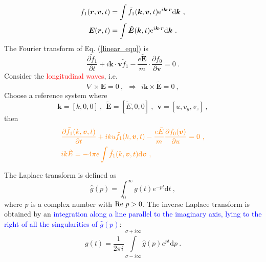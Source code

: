 \documentclass[12pt,a4paper]{article}
\renewcommand{\vec}[1]{\boldsymbol{#1}}
\newcommand{\dif}{\mathrm{d}}
\begin{document}
\begin{align*}
f_1(\vec{r}, \vec{v}, t) &= \int \tilde{f}_1(\vec{k}, \vec{v}, t) {\rm e}^{i\vec{k} \cdot \vec{r} } \dif \vec{k} ~, \\
\vec{E}(\vec{r}, t) &= \int \tilde{\vec{E} }(\vec{k}, t) {\rm e}^{i\vec{k} \cdot \vec{r} } \dif \vec{k} ~.
\end{align*}
The Fourier transform of Eq. (\ref{linear_equ}) is
\begin{equation}
\frac{\partial \tilde{f}_1}{\partial t} +i\vec{k}\cdot \vec{v} \tilde{f}_1 -\frac{e \tilde{\vec{E}} }{m}\cdot \frac{\partial f_0}{\partial \vec{v}} = 0 ~.
\end{equation}
Consider the \textcolor{red}{longitudinal waves}, i.e.
\begin{equation}
\nabla \times \vec{E} = 0 ~, ~~\Longrightarrow ~~ i\vec{k} \times \tilde{\vec{E} } = 0 ~, 
\end{equation}
Choose a reference system where
\begin{equation*}
\vec{k} = [k, 0, 0] ~, ~~\tilde{\vec{E}} = [\tilde{E}, 0, 0] ~, ~~\vec{v} = [u, v_y, v_z] ~,
\end{equation*}
then
\begin{align}
& \color{orange}  \frac{\partial \tilde{f}_1(k, \vec{v}, t)}{\partial t} +i k u \tilde{f}_1(k, \vec{v}, t) -\frac{e \tilde{E} }{m} \frac{\partial f_0(\vec{v})}{\partial u} = 0 ~, \\
& \color{orange}  ik \tilde{E} = -4\pi e \int \tilde{f}_1(k, \vec{v}, t) \dif \vec{v} ~,
\end{align}

The Laplace transform is defined as
\begin{equation*}
\widehat{g}(p) = \int_0^\infty g(t) e^{-pt} \dif t ~,
\end{equation*}
where $p$ is a complex number with \textcolor{yellow}{${\rm Re} ~p > 0$}. The inverse Laplace transform is obtained by an \textcolor{blue}{integration along a line parallel to the imaginary axis, lying to the right of all the singularities of $\widehat{g}(p)$}:
\begin{equation*}
g(t) = \dfrac{1}{2\pi i} \int\limits_{\sigma -i \infty}^{\sigma +i\infty} \widehat{g}(p) e^{pt} \dif p ~.
\end{equation*}
\end{document}
